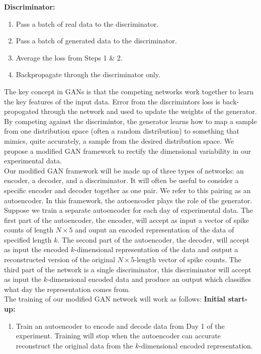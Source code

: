 \documentclass[12pt]{article}
\begin{document}
  \textbf{Discriminator:} \\
  \begin{enumerate}
    \item Pass a batch of real data to the discriminator.
    \item Pass a batch of generated data to the discriminator.
    \item Average the loss from Steps 1 \& 2.
    \item Backpropagate through the discriminator only.
  \end{enumerate}

\indent The key concept in GANs is that the competing networks work together to learn the key features of the input data. Error from the discrimintors loss is back-propogated through the network and used to update the weights of the generator. By competing against the discrimintor, the generator learns how to map a sample from one distribution space (often a random distribution) to something that mimics, quite accurately, a sample from the desired distribution space. We propose a modified GAN framework to rectify the dimensional variability in our experimental data. \\
\indent Our modified GAN framework will be made up of three types of networks: an encoder, a decoder, and a discriminator. It will often be useful to consider a specific encoder and decoder together as one pair. We refer to this pairing as an autoencoder. In this framework, the autoencoder plays the role of the generator. Suppose we train a separate autoencoder for each day of experimental data. The first part of the autoencoder, the encoder, will accept as input a vector of spike counts of length $N\times 5$ and ouput an encoded representation of the data of specified length $k$. The second part of the autoencoder, the decoder, will accept as input the encoded $k$-dimensional representation of the data and output a reconstructed version of the original $N\times 5$-length vector of spike counts. The third part of the network is a single discriminator, this discriminator will accept as input the $k$-dimensional encoded data and produce an output which classifies what day the representation comes from. \\
\indent The training of our modified GAN network will work as follows:
\textbf{Initial start-up:}
\begin{enumerate}
  \item Train an autoencoder to encode and decode data from Day 1 of the experiment. Training will stop when the autoencoder can accurate reconstruct the original data from the $k$-dimensional encoded representation.
\end{enumerate}
\end{document}
